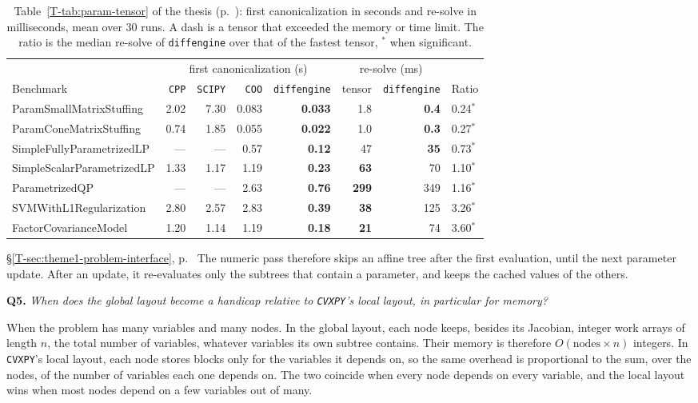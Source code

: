 \documentclass[letterpaper,12pt]{article}
\newcommand{\tsec}[1]{\S\ref{T-#1}}
\newcommand{\tpage}[1]{p.~\pageref{T-#1}}
\newcommand{\tref}[1]{\tsec{#1}, \tpage{#1}}
\newcommand{\question}[2]{\FloatBarrier\par\bigskip\textbf{Q#1.} \emph{#2}\par}
\begin{document}
\begin{table}[htbp]
\centering
\caption{Table~\ref{T-tab:param-tensor} of the thesis (\tpage{tab:param-tensor}): first
canonicalization in seconds and re-solve in milliseconds, mean over $30$ runs. A dash is a tensor
that exceeded the memory or time limit. The ratio is the median re-solve of
\texttt{diffengine} over that of the fastest tensor, $^{*}$ when significant.}
\label{tab:res-param}
{\footnotesize
\setlength{\tabcolsep}{4pt}
\begin{tabular}{l rrrr rr l}
\toprule
& \multicolumn{4}{c}{first canonicalization (s)} & \multicolumn{2}{c}{re-solve (ms)} & \\
\cmidrule(lr){2-5}\cmidrule(lr){6-7}
Benchmark & \texttt{CPP} & \texttt{SCIPY} & \texttt{COO} & \texttt{diffengine}
& tensor & \texttt{diffengine} & Ratio \\
\midrule
ParamSmallMatrixStuffing    & 2.02 & 7.30 & 0.083 & \textbf{0.033} & 1.8 & \textbf{0.4} & 0.24$^{*}$ \\
ParamConeMatrixStuffing     & 0.74 & 1.85 & 0.055 & \textbf{0.022} & 1.0 & \textbf{0.3} & 0.27$^{*}$ \\
SimpleFullyParametrizedLP   & --- & --- & 0.57 & \textbf{0.12} & 47 & \textbf{35} & 0.73$^{*}$ \\
SimpleScalarParametrizedLP  & 1.33 & 1.17 & 1.19 & \textbf{0.23} & \textbf{63} & 70 & 1.10$^{*}$ \\
ParametrizedQP              & --- & --- & 2.63 & \textbf{0.76} & \textbf{299} & 349 & 1.16$^{*}$ \\
SVMWithL1Regularization     & 2.80 & 2.57 & 2.83 & \textbf{0.39} & \textbf{38} & 125 & 3.26$^{*}$ \\
FactorCovarianceModel       & 1.20 & 1.14 & 1.19 & \textbf{0.18} & \textbf{21} & 74 & 3.60$^{*}$ \\
\bottomrule
\end{tabular}}
\end{table}

\begin{thesisquote}{\tref{sec:theme1-problem-interface}}
The numeric pass therefore skips an affine tree after the first evaluation, until the next
parameter update. After an update, it re-evaluates only the subtrees that contain a parameter,
and keeps the cached values of the others.
\end{thesisquote}

\question{5}{When does the global layout become a handicap relative to \texttt{CVXPY}'s local
layout, in particular for memory?}
When the problem has many variables and many nodes. In the global layout, each node keeps,
besides its Jacobian, integer work arrays of length $n$, the total number of variables, whatever
variables its own subtree contains. Their memory is therefore $O(\text{nodes} \times n)$
integers. In \texttt{CVXPY}'s local layout, each node stores blocks only for the variables it
depends on, so the same overhead is proportional to the sum, over the nodes, of the number of
variables each one depends on. The two coincide when every node depends on every variable, and
the local layout wins when most nodes depend on a few variables out of many.
\end{document}
